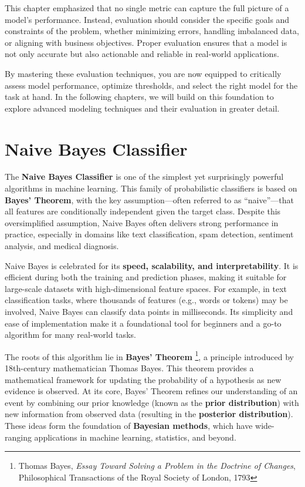 \documentclass[
]{book}
\theoremstyle{definition}
\theoremstyle{definition}
\theoremstyle{definition}
\theoremstyle{definition}
\theoremstyle{remark}
\begin{document}
This chapter emphasized that no single metric can capture the full picture of a model's performance. Instead, evaluation should consider the specific goals and constraints of the problem, whether minimizing errors, handling imbalanced data, or aligning with business objectives. Proper evaluation ensures that a model is not only accurate but also actionable and reliable in real-world applications.

By mastering these evaluation techniques, you are now equipped to critically assess model performance, optimize thresholds, and select the right model for the task at hand. In the following chapters, we will build on this foundation to explore advanced modeling techniques and their evaluation in greater detail.

\chapter{Naive Bayes Classifier}\label{chapter-bayes}

The \textbf{Naive Bayes Classifier} is one of the simplest yet surprisingly powerful algorithms in machine learning. This family of probabilistic classifiers is based on \textbf{Bayes' Theorem}, with the key assumption---often referred to as ``naive''---that all features are conditionally independent given the target class. Despite this oversimplified assumption, Naive Bayes often delivers strong performance in practice, especially in domains like text classification, spam detection, sentiment analysis, and medical diagnosis.

Naive Bayes is celebrated for its \textbf{speed, scalability, and interpretability}. It is efficient during both the training and prediction phases, making it suitable for large-scale datasets with high-dimensional feature spaces. For example, in text classification tasks, where thousands of features (e.g., words or tokens) may be involved, Naive Bayes can classify data points in milliseconds. Its simplicity and ease of implementation make it a foundational tool for beginners and a go-to algorithm for many real-world tasks.

The roots of this algorithm lie in \textbf{Bayes' Theorem} \footnote{Thomas Bayes, \emph{Essay Toward Solving a Problem in the Doctrine of Changes}, Philosophical Transactions of the Royal Society of London, 1793}, a principle introduced by 18th-century mathematician Thomas Bayes. This theorem provides a mathematical framework for updating the probability of a hypothesis as new evidence is observed. At its core, Bayes' Theorem refines our understanding of an event by combining our prior knowledge (known as the \textbf{prior distribution}) with new information from observed data (resulting in the \textbf{posterior distribution}). These ideas form the foundation of \textbf{Bayesian methods}, which have wide-ranging applications in machine learning, statistics, and beyond.
\end{document}
